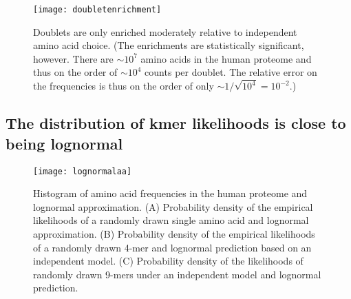 \documentclass[superscriptaddress,twocolumn,pre]{revtex4}
\newcommand{\<}{\langle}
\renewcommand{\>}{\rangle}
\begin{document}
\begin{figure}
    \texttt{[image: doubletenrichment]}
    \caption{Doublets are only enriched moderately relative to independent amino acid choice. (The enrichments are statistically significant, however. There are $\sim 10^7$ amino acids in the human proteome and thus on the order of $\sim 10^4$ counts per doublet. The relative error on the frequencies is thus on the order of only $\sim 1/\sqrt{10^4} = 10^{-2}$.)
    \label{figdoubletentrichment}
    }
\end{figure}

\subsection{The distribution of kmer likelihoods is close to being lognormal}

\begin{figure}
    \texttt{[image: lognormalaa]}
    \caption{Histogram of amino acid frequencies in the human proteome and lognormal approximation. (A) Probability density of the empirical likelihoods of a randomly drawn single amino acid and lognormal approximation. (B) Probability density of the empirical likelihoods of a randomly drawn 4-mer and lognormal prediction based on an independent model.
    (C) Probability density of the likelihoods of randomly drawn 9-mers under an independent model and lognormal prediction.
    \label{figlognormalaa}
    }
\end{figure}
\end{document}
